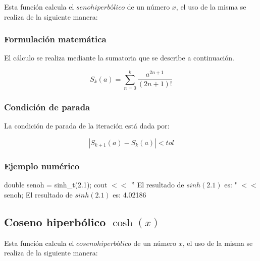 \documentclass[10pt,a4paper]{article}
\begin{document}
	Esta función calcula el $seno hiperbólico$ de un número $x$, el uso de la misma se realiza de la siguiente manera:
	
	\begin{center}
	\end{center}
	
	\subsubsection{Formulación matemática}
	
	El cálculo se realiza mediante la sumatoria que se describe a continuación.
	
	\begin{equation}\label{key14}
		S_{k}(a) = \sum_{n=0}^{k}\frac{a^{2n + 1}}{(2n + 1)!}
	\end{equation}
	
	\subsubsection{Condición de parada}
	
	La condición de parada de la iteración está dada por: 
	
	\begin{equation}\label{key15}
		\left\lvert S_{k+1}(a) - S_{k}(a) \right\lvert < tol
	\end{equation}
		
	\subsubsection{Ejemplo numérico}

	double senoh = sinh{\_}t(2.1); \newline
	cout $<<$ $"$ El resultado de $sinh(2.1)$ es: " $<<$ senoh; \newline
	El resultado de $sinh(2.1)$ es: 4.02186\newline
	
	\subsection{Coseno hiperbólico $\cosh(x)$}
	
	Esta función calcula el $coseno hiperbólico$ de un número $x$, el uso de la misma se realiza de la siguiente manera:
	
	\begin{center}
	\end{center}
	
\end{document}
